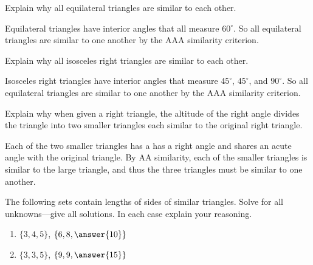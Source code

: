 \documentclass[nooutcomes]{ximera}
\begin{document}
\begin{question}
Explain why all equilateral triangles are similar to each other.
\begin{freeResponse}
\begin{hint}
Equilateral triangles have interior angles that all measure $60^\circ$.  So all equilateral triangles are similar to one another by the AAA similarity criterion.  
\end{hint}
\end{freeResponse}
\end{question}

\begin{question}Explain why all isosceles right triangles are similar to each other. 
\begin{freeResponse}
\begin{hint}
Isosceles right triangles have interior angles that measure $45^\circ$, $45^\circ$, and $90^\circ$.  So all equilateral triangles are similar to one another by the AAA similarity criterion.  
\end{hint}
\end{freeResponse}
\end{question}

\begin{question}
Explain why when given a right triangle, the altitude of the
  right angle divides the triangle into two smaller triangles each
  similar to the original right triangle.
\begin{freeResponse}
\begin{hint}
Each of the two smaller triangles has a has a right angle and shares an acute angle with the original triangle.  By AA similarity, each of the smaller triangles is similar to the large triangle, and thus the three triangles must be similar to one another.  
\end{hint}
\end{freeResponse}
\end{question}

\begin{question}
The following sets contain lengths of sides of similar
  triangles. Solve for all unknowns---give all solutions. In each case
  explain your reasoning.
\begin{enumerate}
\item $\{3,4,5\}$, $\{6,8,\answer{10}\}$
\item $\{3,3,5\}$, $\{9,9,\answer{15}\}$
\end{enumerate}
\begin{freeResponse}
\begin{hint}
\end{hint}
\end{freeResponse}
\end{question}
\end{document}
